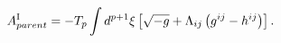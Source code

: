 \begin{equation}
A^{{\rm I}}_{parent}=-T_{p}\int d^{p+1}{\xi}\left[\sqrt{-g}+{\Lambda}_{ij}
\left(g^{ij}-h^{ij}\right)\right].
\label{np1}
\end{equation}

